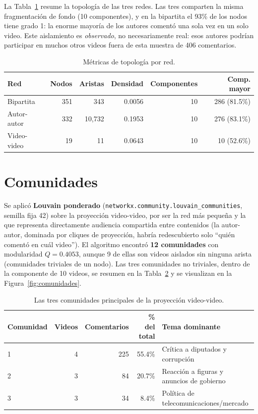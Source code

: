 \documentclass[11pt]{article}
\begin{document}
La Tabla~\ref{tab:topologia} resume la topolog\'ia de las tres redes. Las tres
comparten la misma fragmentaci\'on de fondo (10 componentes), y en la bipartita el
93\% de los nodos tiene grado 1: la enorme mayor\'ia de los autores coment\'o una sola
vez en un solo video. Este aislamiento es \emph{observado}, no necesariamente real:
esos autores podr\'ian participar en muchos otros videos fuera de esta muestra de 406
comentarios.

\begin{table}[H]
\centering
\caption{M\'etricas de topolog\'ia por red.}
\label{tab:topologia}
\begin{tabular}{lrrrrr}
\toprule
Red & Nodos & Aristas & Densidad & Componentes & Comp. mayor \\
\midrule
Bipartita & 351 & 343 & 0.0056 & 10 & 286 (81.5\%) \\
Autor-autor & 332 & 10{,}732 & 0.1953 & 10 & 276 (83.1\%) \\
Video-video & 19 & 11 & 0.0643 & 10 & 10 (52.6\%) \\
\bottomrule
\end{tabular}
\end{table}

\section{Comunidades}

Se aplic\'o \textbf{Louvain ponderado} (\texttt{networkx.community.louvain\_communities},
semilla fija 42) sobre la proyecci\'on video-video, por ser la red m\'as peque\~na y
la que representa directamente audiencia compartida entre contenidos (la
autor-autor, dominada por cliques de proyecci\'on, habr\'ia redescubierto solo ``qui\'en
coment\'o en cu\'al video''). El algoritmo encontr\'o \textbf{12 comunidades} con
modularidad $Q = 0.4053$, aunque 9 de ellas son videos aislados sin ninguna arista
(comunidades triviales de un nodo). Las tres comunidades no triviales, dentro de la
componente de 10 videos, se resumen en la Tabla~\ref{tab:comunidades} y se
visualizan en la Figura~\ref{fig:comunidades}.

\begin{table}[H]
\centering
\caption{Las tres comunidades principales de la proyecci\'on video-video.}
\label{tab:comunidades}
\begin{tabular}{lrrrl}
\toprule
Comunidad & Videos & Comentarios & \% del total & Tema dominante \\
\midrule
1 & 4 & 225 & 55.4\% & Cr\'itica a diputados y corrupci\'on \\
2 & 3 & 84 & 20.7\% & Reacci\'on a figuras y anuncios de gobierno \\
3 & 3 & 34 & 8.4\% & Pol\'itica de telecomunicaciones/mercado \\
\bottomrule
\end{tabular}
\end{table}
\end{document}
